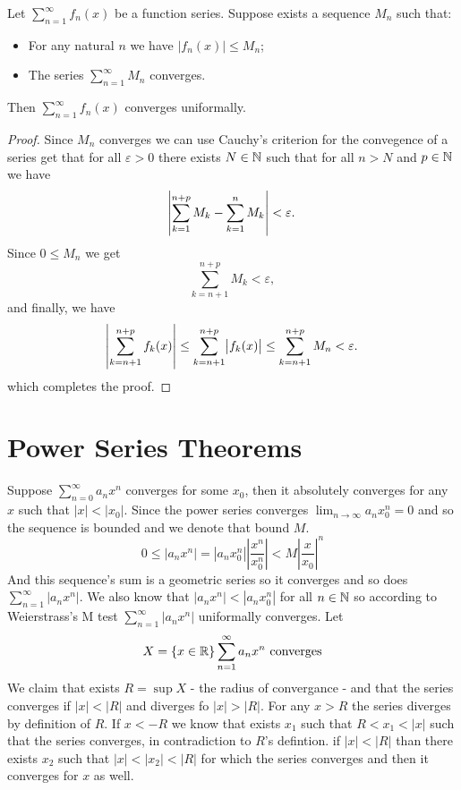 \documentclass[11pt,a4paper]{article}
\begin{document}
  \begin{proposition}
    Let $\sum_{n=1}^{\infty}{f_n(x)}$ be a function series. 
    Suppose exists a sequence $M_n$ such that:
    \begin{itemize}
        \item For any natural $n$ we have $|f_n(x)| \le M_n$;
        \item The series $\sum_{n=1}^{\infty}{M_n}$ converges.
    \end{itemize}
    Then $\sum_{n=1}^\infty f_n(x)$ converges uniformally.
  \end{proposition}
  \begin{proof}
    Since $M_n$ converges we can use Cauchy's criterion for the convegence 
    of a series get that for all $\varepsilon > 0$ there exists $N \in \mathbb{N}$
    such that for all $n > N$ and $p \in \mathbb{N}$ we have
    \[
      \abs{\sum_{k=1}^{n+p} M_k - \sum_{k=1}^{n} M_k} < \varepsilon.
    \]
    Since $0 \le M_n$ we get
    \[
      \sum_{k=n+1}^{n+p} M_k < \varepsilon,
    \]
    and finally, we have
    \[
      \abs{\sum_{k=n+1}^{n+p} f_k(x)}   \le 
      \sum_{k=n+1}^{n+p} \abs{f_k(x)} \le 
      \sum_{k=n+1}^{n+p} M_n < \varepsilon.
    \]
    which completes the proof.
  \end{proof}
		
	\newpage
	
	\section{Power Series Theorems}
	Suppose $\sum_{n=0}^\infty a_nx^n$ converges for some $x_0$, 
	then it absolutely converges for any $x$ such that $|x|<|x_0|$.
	Since the power series converges $\lim_{n\to\infty}{a_nx_0^n}=0$ 
	and so the sequence is bounded 
	and we denote that bound $M$.
	\[
		0 \le |a_nx^n| 
		= |a_nx_0^n|\left|\frac{x^n}{x_0^n}\right| 
		< M\left|\frac{x}{x_0}\right|^n
	\]
	And this sequence's sum is a geometric series so it converges and so does 
	$\sum_{n=1}^\infty|a_nx^n|$. 
	We also know that $|a_nx^n| < |a_nx_0^n|$ for all $n\in\mathbb{N}$ so according to 
	Weierstrass's M test $\sum_{n=1}^\infty|a_nx^n|$ uniformally converges. 
	Let
	\[
    X = \set{x \in \mathbb{R}}{\sum_{n=1}^\infty{a_n x^n}\text{ converges}}
	\]
	We claim that exists $R = \sup X$ - the radius of convergance - 
	and that the series converges if $|x|<|R|$ and diverges fo $|x|>|R|$. 
	For any $x>R$ the series diverges by definition of $R$. 
	If $x < -R$ we know that exists $x_1$ such that $R < x_1 < |x|$ such that 
	the series converges, in contradiction to $R$'s defintion. 
	if $|x|<|R|$ than there exists $x_2$ such that $|x|<|x_2|<|R|$ 
	for which the series converges and then it converges for $x$ as well.
	
\end{document}
